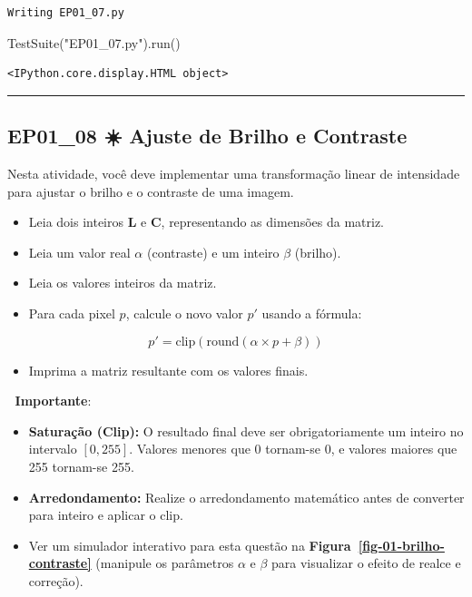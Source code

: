 \documentclass[
  portuguese,
  letterpaper,
  openany,
  oneside,
  12pt,
  a4paper]{book}
\newenvironment{Shaded}{\begin{snugshade}}{\end{snugshade}}
\newcommand{\NormalTok}[1]{\textcolor[rgb]{0.00,0.23,0.31}{#1}}
\newcommand{\StringTok}[1]{\textcolor[rgb]{0.13,0.47,0.30}{#1}}
\providecommand{\tightlist}{%
  \setlength{\itemsep}{0pt}\setlength{\parskip}{0pt}}
\begin{document}
\begin{verbatim}
Writing EP01_07.py
\end{verbatim}

\begin{Shaded}
\begin{Highlighting}[]
\NormalTok{TestSuite(}\StringTok{"EP01\_07.py"}\NormalTok{).run()}
\end{Highlighting}
\end{Shaded}

\begin{verbatim}
<IPython.core.display.HTML object>
\end{verbatim}

\begin{center}\rule{0.5\linewidth}{0.5pt}\end{center}

\subsection{EP01\_08 ☀️ Ajuste de Brilho e
Contraste}\label{ep01_08-ajuste-de-brilho-e-contraste}

Nesta atividade, você deve implementar uma transformação linear de
intensidade para ajustar o brilho e o contraste de uma imagem.

\begin{itemize}
\tightlist
\item
  Leia dois inteiros \textbf{L} e \textbf{C}, representando as dimensões
  da matriz.
\item
  Leia um valor real \textbf{\(\alpha\)} (contraste) e um inteiro
  \textbf{\(\beta\)} (brilho).
\item
  Leia os valores inteiros da matriz.
\item
  Para cada pixel \(p\), calcule o novo valor \(p'\) usando a fórmula:
\end{itemize}

\[p' = \text{clip}(\text{round}(\alpha \times p + \beta))\]

\begin{itemize}
\tightlist
\item
  Imprima a matriz resultante com os valores finais.
\end{itemize}

📌 \textbf{Importante}:

\begin{itemize}
\tightlist
\item
  \textbf{Saturação (Clip):} O resultado final deve ser obrigatoriamente
  um inteiro no intervalo \([0, 255]\). Valores menores que 0 tornam-se
  0, e valores maiores que 255 tornam-se 255.
\item
  \textbf{Arredondamento:} Realize o arredondamento matemático antes de
  converter para inteiro e aplicar o clip.
\item
  Ver um simulador interativo para esta questão na
  \textbf{Figura~\ref{fig-01-brilho-contraste}} (manipule os parâmetros
  \(\alpha\) e \(\beta\) para visualizar o efeito de realce e correção).
\end{itemize}
\end{document}
